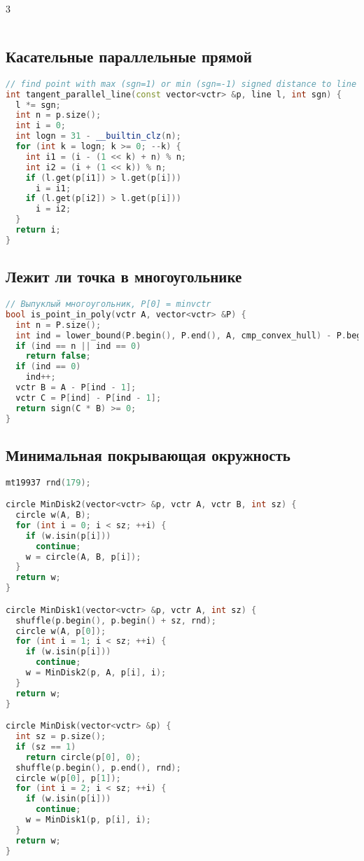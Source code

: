 \documentclass[9pt,a4paper,landscape,twosided]{extarticle}
\begin{document}
\begin{multicols*}{3}
\begin{lstlisting}[language=C++]
\end{lstlisting}

\subsection{Касательные параллельные прямой}
\begin{lstlisting}[language=C++]
// find point with max (sgn=1) or min (sgn=-1) signed distance to line
int tangent_parallel_line(const vector<vctr> &p, line l, int sgn) {
  l *= sgn;
  int n = p.size();
  int i = 0;
  int logn = 31 - __builtin_clz(n);
  for (int k = logn; k >= 0; --k) {
    int i1 = (i - (1 << k) + n) % n;
    int i2 = (i + (1 << k)) % n;
    if (l.get(p[i1]) > l.get(p[i]))
      i = i1;
    if (l.get(p[i2]) > l.get(p[i]))
      i = i2;
  }
  return i;
}

\end{lstlisting}

\subsection{Лежит ли точка в многоугольнике}
\begin{lstlisting}[language=C++]
// Выпуклый многоугольник, P[0] = minvctr
bool is_point_in_poly(vctr A, vector<vctr> &P) {
  int n = P.size();
  int ind = lower_bound(P.begin(), P.end(), A, cmp_convex_hull) - P.begin();
  if (ind == n || ind == 0)
    return false;
  if (ind == 0)
    ind++;
  vctr B = A - P[ind - 1];
  vctr C = P[ind] - P[ind - 1];
  return sign(C * B) >= 0;
}

\end{lstlisting}

\subsection{Минимальная покрывающая окружность}
\begin{lstlisting}[language=C++]
mt19937 rnd(179);

circle MinDisk2(vector<vctr> &p, vctr A, vctr B, int sz) {
  circle w(A, B);
  for (int i = 0; i < sz; ++i) {
    if (w.isin(p[i]))
      continue;
    w = circle(A, B, p[i]);
  }
  return w;
}

circle MinDisk1(vector<vctr> &p, vctr A, int sz) {
  shuffle(p.begin(), p.begin() + sz, rnd);
  circle w(A, p[0]);
  for (int i = 1; i < sz; ++i) {
    if (w.isin(p[i]))
      continue;
    w = MinDisk2(p, A, p[i], i);
  }
  return w;
}

circle MinDisk(vector<vctr> &p) {
  int sz = p.size();
  if (sz == 1)
    return circle(p[0], 0);
  shuffle(p.begin(), p.end(), rnd);
  circle w(p[0], p[1]);
  for (int i = 2; i < sz; ++i) {
    if (w.isin(p[i]))
      continue;
    w = MinDisk1(p, p[i], i);
  }
  return w;
}


\end{lstlisting}
\end{multicols*}
\end{document}
